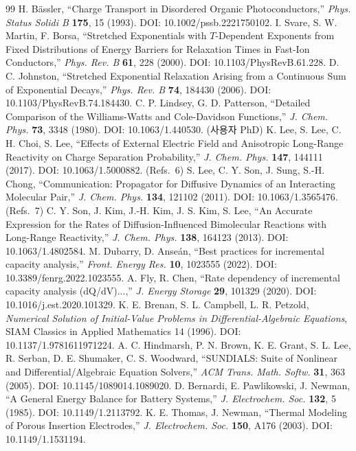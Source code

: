 \documentclass[11pt,a4paper]{article}
\newcommand{\brk}{\discretionary{}{}{}}%
\begin{document}
\begin{thebibliography}{99}
 H. B\"assler, ``Charge Transport in Disordered Organic Photoconductors,''
  \emph{Phys. Status Solidi B} \textbf{175}, 15 (1993). DOI: 10.1002/pssb.2221750102.
 I. Svare, S. W. Martin, F. Borsa, ``Stretched Exponentials with $T$-Dependent
  Exponents from Fixed Distributions of Energy Barriers for Relaxation Times in Fast-Ion Conductors,''
  \emph{Phys. Rev. B} \textbf{61}, 228 (2000). DOI: 10.1103/PhysRevB.61.228.
 D. C. Johnston, ``Stretched Exponential Relaxation Arising from a Continuous Sum
  of Exponential Decays,'' \emph{Phys. Rev. B} \textbf{74}, 184430 (2006). DOI: 10.1103/PhysRevB.74.184430.
 C. P. Lindsey, G. D. Patterson, ``Detailed Comparison of the Williams-Watts and
  Cole-Davidson Functions,'' \emph{J. Chem. Phys.} \textbf{73}, 3348 (1980). DOI: 10.1063/1.440530.
 (사용자 PhD) K. Lee, S. Lee, C. H. Choi, S. Lee, ``Effects of External Electric Field and Anisotropic Long-Range Reactivity on Charge Separation Probability,''
  \emph{J. Chem. Phys.} \textbf{147}, 144111 (2017). DOI: 10.1063/1.5000882.
 (Refs.~6) S. Lee, C. Y. Son, J. Sung, S.-H. Chong, ``Communication: Propagator for Diffusive Dynamics of an Interacting Molecular Pair,''
  \emph{J. Chem. Phys.} \textbf{134}, 121102 (2011). DOI: 10.1063/1.3565476.
 (Refs.~7) C. Y. Son, J. Kim, J.-H. Kim, J. S. Kim, S. Lee, ``An Accurate Expression for the Rates of Diffusion-Influenced Bimolecular Reactions with Long-Range Reactivity,''
  \emph{J. Chem. Phys.} \textbf{138}, 164123 (2013). DOI: 10.1063/1.4802584.
 M. Dubarry, D. Anseán, ``Best practices for incremental capacity analysis,''
  \emph{Front. Energy Res.} \textbf{10}, 1023555 (2022). DOI: 10.3389/fenrg.2022.1023555.
 A. Fly, R. Chen, ``Rate dependency of incremental capacity analysis (dQ/dV)...,''
  \emph{J. Energy Storage} \textbf{29}, 101329 (2020). DOI: 10.1016/j.est.2020.101329.
 K. E. Brenan, S. L. Campbell, L. R. Petzold, \emph{Numerical Solution of Initial-Value
  Problems in Differential-Algebraic Equations}, SIAM Classics in Applied Mathematics 14 (1996).
  DOI: 10.1137/\brk 1.9781611971224.
 A. C. Hindmarsh, P. N. Brown, K. E. Grant, S. L. Lee, R. Serban, D. E. Shumaker,
  C. S. Woodward, ``SUNDIALS: Suite of Nonlinear and Differential/Algebraic Equation Solvers,''
  \emph{ACM Trans. Math. Softw.} \textbf{31}, 363 (2005). DOI: 10.1145/\brk 1089014.1089020.
 D. Bernardi, E. Pawlikowski, J. Newman, ``A General Energy Balance for Battery
  Systems,'' \emph{J. Electrochem. Soc.} \textbf{132}, 5 (1985). DOI: 10.1149/\brk 1.2113792.
 K. E. Thomas, J. Newman, ``Thermal Modeling of Porous Insertion Electrodes,''
  \emph{J. Electrochem. Soc.} \textbf{150}, A176 (2003). DOI: 10.1149/\brk 1.1531194.
\end{thebibliography}
\end{document}
